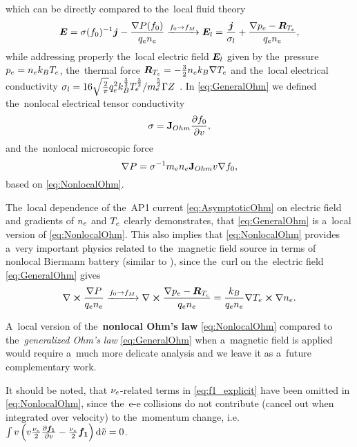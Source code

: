 which can be directly compared to the~local fluid theory 
\begin{equation}
  \boldsymbol{E} = \mathbf{\sigma}(f_0)^{-1} \boldsymbol{j} 
  - \frac{\nabla P (f_0)}{q_e n_e}
  \xrightarrow{f_0 \rightarrow f_M}
  \boldsymbol{E}_{l} = \frac{\boldsymbol{j}}{\sigma_{l}}
  + \frac{\nabla p_e - \boldsymbol{R}_{T_e}}{q_e n_e} 
  ,
  \label{eq:GeneralOhm} 
\end{equation}
while addressing properly the~local electric field $\boldsymbol{E}_{l}$ given by
the~pressure $p_e = n_e k_B T_e$,
the~thermal force $\boldsymbol{R}_{T_e} = - \frac{3}{2} n_e k_B \nabla T_e$ 
and the~local electrical conductivity 
$\sigma_{l} = 16\sqrt{\frac{2}{\pi}}q_e^2 k_B^\frac{3}{2} T_e^\frac{3}{2}
/ m_e^\frac{5}{2} \Gamma Z$ \cite{Braginskii_1965_3}.
In \eqref{eq:GeneralOhm} we defined the~nonlocal electrical tensor conductivity 
\begin{equation}
  \mathbf{\sigma} = \mathbf{J}_{Ohm}\frac{\partial{f_0}}{\partial{v}}
  ,
  \label{eq:NonlocalSigma}
\end{equation}
and the~nonlocal microscopic force
\begin{equation}
  \nabla P = \mathbf{\sigma}^{-1}m_en_e \mathbf{J}_{Ohm}v \nabla f_0
  ,
  \label{eq:NonlocalGradP}
\end{equation}
based on \eqref{eq:NonlocalOhm}.

The~local dependence of the~AP1 current \eqref{eq:AsymptoticOhm} 
on electric field and gradients of $n_e$ and $T_e$ clearly demonstrates, 
that \eqref{eq:GeneralOhm} is a~local version of \eqref{eq:NonlocalOhm}.
This also implies that \eqref{eq:NonlocalOhm} provides a~very important 
physics related to the~magnetic field source in terms of nonlocal 
Biermann battery (similar to \cite{Kingham_PRL2002}),
since the~curl on the~electric field 
\eqref{eq:GeneralOhm} gives
\begin{equation}
  \nabla\boldsymbol{\times} \frac{\nabla P}{q_e n_e} 
  \xrightarrow{f_0 \rightarrow f_M} 
  \nabla\boldsymbol{\times} \frac{\nabla p_e - \boldsymbol{R}_{T_e}}{q_e n_e} =
  \frac{k_B}{q_en_e}\nabla T_e \boldsymbol{\times}\nabla n_e
  .
  \label{eq:NonlocalBiermann}
\end{equation}

A~local version of the~{\bf nonlocal Ohm's law} \eqref{eq:NonlocalOhm} 
compared to the~\textit{generalized Ohm's law} \eqref{eq:GeneralOhm} when
a~magnetic field is applied would require a~much more delicate analysis and 
we leave it as a~future complementary work.

It should be noted, that $\nu_{e}$-related terms in \eqref{eq:f1_explicit} 
have been omitted in \eqref{eq:NonlocalOhm}, 
since the~e-e collisions do not contribute 
(cancel out when integrated over velocity) to the~momentum
change, i.e. 
$\int v \left( v\frac{\nu_{e}}{2}\frac{\partial{{\boldsymbol{f_1}}}}{\partial{v}}
  - \frac{\nu_{e}}{2}{\boldsymbol{f_1}}\right) \text{d}\tilde{v} = 0$.

